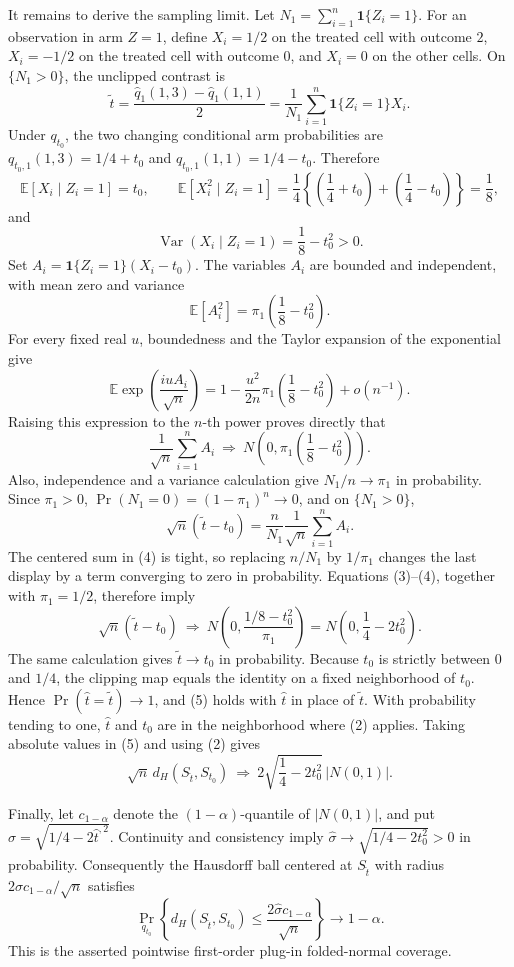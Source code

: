 It remains to derive the sampling limit.  Let \(N_1=\sum_{i=1}^n\mathbf 1\{Z_i=1\}\).  For an observation in arm \(Z=1\), define \(X_i=1/2\) on the treated cell with outcome \(2\), \(X_i=-1/2\) on the treated cell with outcome \(0\), and \(X_i=0\) on the other cells.  On \(\{N_1>0\}\), the unclipped contrast is
\[
\widetilde t
=\frac{\widehat q_1(1,3)-\widehat q_1(1,1)}2
=\frac1{N_1}\sum_{i=1}^n\mathbf 1\{Z_i=1\}X_i.
\]
Under \(q_{t_0}\), the two changing conditional arm probabilities are \(q_{t_0,1}(1,3)=1/4+t_0\) and \(q_{t_0,1}(1,1)=1/4-t_0\).  Therefore
\[
\mathbb E[X_i\mid Z_i=1]=t_0,
\qquad
\mathbb E[X_i^2\mid Z_i=1]
=\frac14\left\{\left(\frac14+t_0\right)+\left(\frac14-t_0\right)\right\}
=\frac18,
\]
and
\[
\operatorname{Var}(X_i\mid Z_i=1)=\frac18-t_0^2>0.
\tag{3}
\]
Set \(A_i=\mathbf 1\{Z_i=1\}(X_i-t_0)\).  The variables \(A_i\) are bounded and independent, with mean zero and variance
\[
\mathbb E[A_i^2]=\pi_1\left(\frac18-t_0^2\right).
\]
For every fixed real \(u\), boundedness and the Taylor expansion of the exponential give
\[
\mathbb E\exp\left(\frac{iuA_i}{\sqrt n}\right)
=1-\frac{u^2}{2n}\pi_1\left(\frac18-t_0^2\right)+o(n^{-1}).
\]
Raising this expression to the \(n\)-th power proves directly that
\[
\frac1{\sqrt n}\sum_{i=1}^n A_i
\ \Rightarrow\ 
N\!\left(0,\pi_1\left(\frac18-t_0^2\right)\right).
\tag{4}
\]
Also, independence and a variance calculation give \(N_1/n\to\pi_1\) in probability.  Since \(\pi_1>0\), \(\Pr(N_1=0)=(1-\pi_1)^n\to0\), and on \(\{N_1>0\}\),
\[
\sqrt n(\widetilde t-t_0)
=\frac{n}{N_1}\frac1{\sqrt n}\sum_{i=1}^n A_i.
\]
The centered sum in (4) is tight, so replacing \(n/N_1\) by \(1/\pi_1\) changes the last display by a term converging to zero in probability.  Equations (3)--(4), together with \(\pi_1=1/2\), therefore imply
\[
\sqrt n(\widetilde t-t_0)
\ \Rightarrow\ 
N\!\left(0,\frac{1/8-t_0^2}{\pi_1}\right)
=N\!\left(0,\frac14-2t_0^2\right).
\tag{5}
\]
The same calculation gives \(\widetilde t\to t_0\) in probability.  Because \(t_0\) is strictly between \(0\) and \(1/4\), the clipping map equals the identity on a fixed neighborhood of \(t_0\).  Hence \(\Pr(\widehat t=\widetilde t)\to1\), and (5) holds with \(\widehat t\) in place of \(\widetilde t\).  With probability tending to one, \(\widehat t\) and \(t_0\) are in the neighborhood where (2) applies.  Taking absolute values in (5) and using (2) gives
\[
\sqrt n\,d_H(S_{\widehat t},S_{t_0})
\ \Rightarrow\ 
2\sqrt{\frac14-2t_0^2}\,|N(0,1)|.
\]

Finally, let \(c_{1-\alpha}\) denote the \((1-\alpha)\)-quantile of \(|N(0,1)|\), and put \(\widehat\sigma=\sqrt{1/4-2\widehat t^{,2}}\).  Continuity and consistency imply \(\widehat\sigma\to\sqrt{1/4-2t_0^2}>0\) in probability.  Consequently the Hausdorff ball centered at \(S_{\widehat t}\) with radius \(2\widehat\sigma c_{1-\alpha}/\sqrt n\) satisfies
\[
\Pr_{q_{t_0}}\!\left\{d_H(S_{\widehat t},S_{t_0})
\le \frac{2\widehat\sigma c_{1-\alpha}}{\sqrt n}\right\}
\longrightarrow 1-\alpha.
\]
This is the asserted pointwise first-order plug-in folded-normal coverage.
